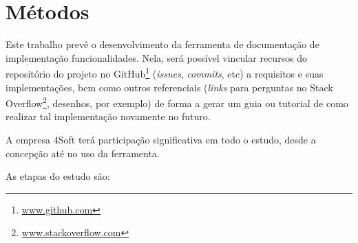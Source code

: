 \chapter{Métodos}


Este trabalho prevê o desenvolvimento da ferramenta de documentação de implementação funcionalidades. Nela, será possível vincular recursos do repositório do projeto no GitHub\footnote{\url{www.github.com}} (\textit{issues}, \textit{commits}, etc) a requisitos e suas implementações, bem como outros referenciais (\textit{links} para perguntas no Stack Overflow\footnote{\url{www.stackoverflow.com}}, desenhos, por exemplo) de forma a gerar um guia ou tutorial de como realizar tal implementação novamente no futuro.

A empresa 4Soft terá participação significativa em todo o estudo, desde a concepção até no uso da ferramenta.


As etapas do estudo são:



